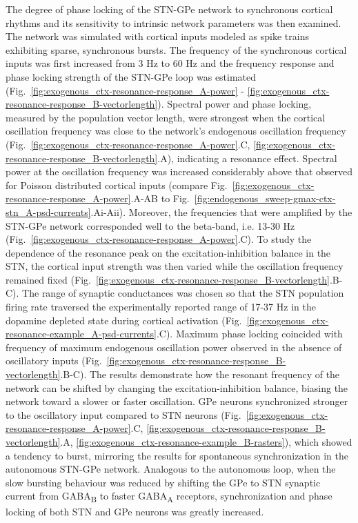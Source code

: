 %
The degree of phase locking of the STN-GPe network to synchronous cortical rhythms and its sensitivity to intrinsic network parameters was then examined. The network was simulated with cortical inputs modeled as spike trains exhibiting sparse, synchronous bursts.
%
The frequency of the synchronous cortical inputs was first increased from 3 Hz to 60 Hz and the frequency response and phase locking strength of the STN-GPe loop was estimated (Fig.~\ref{fig:exogenous_ctx-resonance-response_A-power} - \ref{fig:exogenous_ctx-resonance-response_B-vectorlength}). Spectral power and phase locking, measured by the population vector length, were strongest when the cortical oscillation frequency was close to the network's endogenous oscillation frequency (Fig.~\ref{fig:exogenous_ctx-resonance-response_A-power}.C, \ref{fig:exogenous_ctx-resonance-response_B-vectorlength}.A), indicating a resonance effect. Spectral power at the oscillation frequency was increased considerably above that observed for Poisson distributed cortical inputs (compare Fig.~\ref{fig:exogenous_ctx-resonance-response_A-power}.A-AB to Fig.~\ref{fig:endogenous_sweep-gmax-ctx-stn_A-psd-currents}.Ai-Aii). Moreover, the frequencies that were amplified by the STN-GPe network corresponded well to the beta-band, i.e. 13-30 Hz (Fig.~\ref{fig:exogenous_ctx-resonance-response_A-power}.C).
%
%
To study the dependence of the resonance peak on the excitation-inhibition balance in the STN, the cortical input strength was then varied while the oscillation frequency remained fixed (Fig.~\ref{fig:exogenous_ctx-resonance-response_B-vectorlength}.B-C). The range of synaptic conductances was chosen so that the STN population firing rate traversed the experimentally reported range of 17-37 Hz \cite{kita_cortical_2011,mallet_disrupted_2008} in the dopamine depleted state during cortical activation (Fig.~\ref{fig:exogenous_ctx-resonance-example_A-psd-currents}.C).
%
%
Maximum phase locking coincided with frequency of maximum endogenous oscillation power observed in the absence of oscillatory inputs (Fig.~\ref{fig:exogenous_ctx-resonance-response_B-vectorlength}.B-C). The results demonstrate how the resonant frequency of the network can be shifted by changing the excitation-inhibition balance, biasing the network toward a slower or faster oscillation.
GPe neurons synchronized stronger to the oscillatory input compared to STN neurons (Fig.~\ref{fig:exogenous_ctx-resonance-response_A-power}.C, \ref{fig:exogenous_ctx-resonance-response_B-vectorlength}.A, \ref{fig:exogenous_ctx-resonance-example_B-rasters}), which showed a tendency to burst, mirroring the results for spontaneous synchronization in the autonomous STN-GPe network. Analogous to the autonomous loop, when the slow bursting behaviour was reduced by shifting the GPe to STN synaptic current from GABA\textsubscript{B} to faster GABA\textsubscript{A} receptors, synchronization and phase locking of both STN and GPe neurons was greatly increased.
%
%
%
%
%
%
%

